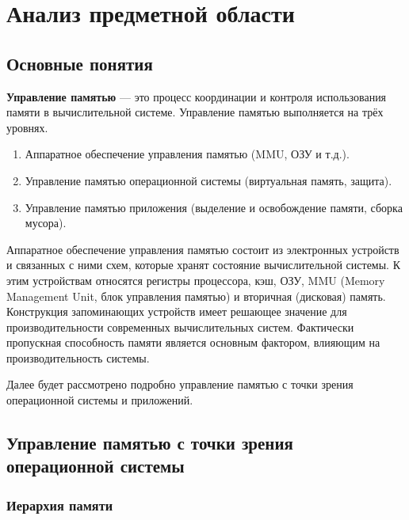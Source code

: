 \chapter{Анализ предметной области}

\section{Основные понятия}

\textbf{Управление памятью} \cite{glossary} --- это процесс координации и контроля использования памяти в вычислительной системе. Управление памятью выполняется на трёх уровнях. 

\begin{enumerate}[label*=\arabic*.]
	\item Аппаратное обеспечение управления памятью (MMU, ОЗУ и т.д.).
	\item Управление памятью операционной системы (виртуальная память, защита).
	\item Управление памятью приложения (выделение и освобождение памяти, сборка мусора).
\end{enumerate}

Аппаратное обеспечение управления памятью состоит из электронных устройств и связанных с ними схем, которые хранят состояние вычислительной системы. К этим устройствам относятся регистры процессора, кэш, ОЗУ, MMU (Memory Management Unit, блок управления памятью) и вторичная (дисковая) память. Конструкция запоминающих устройств имеет решающее значение для производительности современных вычислительных систем. Фактически пропускная способность памяти является основным фактором, влияющим на производительность системы. \cite{glossary}

Далее будет рассмотрено подробно управление памятью с точки зрения операционной системы и приложений.



\section{Управление памятью с точки зрения операционной системы}

\subsection{Иерархия памяти}

